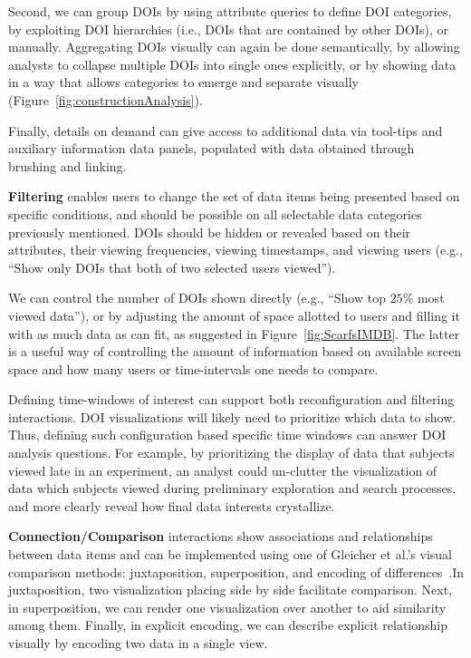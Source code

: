 Second, we can group DOIs by using attribute queries to define DOI categories, by exploiting DOI hierarchies (i.e., DOIs that are contained by other DOIs), or manually. Aggregating DOIs visually can again be done semantically, by allowing analysts to collapse multiple DOIs into single ones explicitly, or by showing data in a way that allows categories to emerge and separate visually (Figure~\ref{fig:constructionAnalysis}). 

Finally, details on demand can give access to additional data via tool-tips and auxiliary information data panels, populated with data obtained through brushing and linking.
  
	
\textbf{Filtering} enables users to change the set of data items being presented based on specific conditions, and should be possible on all selectable data categories previously mentioned. DOIs should be hidden or revealed based on their attributes, their viewing frequencies, viewing timestamps, and viewing users (e.g., ``Show only DOIs that both of two selected users viewed'').

We can control the number of DOIs shown directly (e.g., ``Show top $25\%$ most viewed data''), or by adjusting the amount of space allotted to users and filling it with as much data as can fit, as suggested in Figure~\ref{fig:ScarfsIMDB}. The latter is a useful way of controlling the amount of information based on available screen space and how many users or time-intervals one needs to compare.

Defining time-windows of interest can support both reconfiguration and filtering interactions. DOI visualizations will likely need to prioritize which data to show. Thus,  defining such configuration based specific time windows can answer DOI analysis questions. For example, by prioritizing the display of data that subjects viewed late in an experiment, an analyst could un-clutter the visualization of data which subjects viewed during preliminary exploration and search processes, and more clearly reveal how final data interests crystallize.

\textbf{Connection/Comparison} interactions show associations and relationships between data items and can be implemented using one of Gleicher et al.'s visual comparison methods: juxtaposition, superposition, and encoding of differences~\cite{Glei11}.In juxtaposition, two visualization placing side by side facilitate comparison. Next, in superposition, we can render one visualization over another to aid similarity among them. Finally, in explicit encoding, we can describe explicit relationship visually by encoding two data in a single view.

